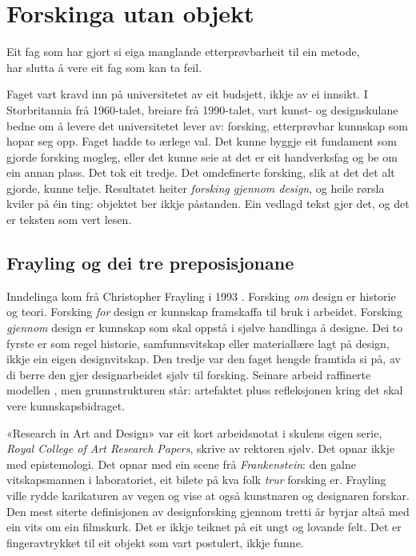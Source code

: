 \chapter{Forskinga utan objekt}

\begin{motto}
Eit fag som har gjort si eiga manglande etterprøvbarheit til ein metode,\\ har slutta å vere eit fag som kan ta feil.
\end{motto}

Faget vart kravd inn på universitetet av eit budsjett, ikkje av ei innsikt. I Storbritannia frå 1960-talet, breiare frå 1990-talet, vart kunst- og designskulane bedne om å levere det universitetet lever av: forsking, etterprøvbar kunnskap som hopar seg opp. Faget hadde to ærlege val. Det kunne byggje eit fundament som gjorde forsking mogleg, eller det kunne seie at det er eit handverksfag og be om ein annan plass. Det tok eit tredje. Det omdefinerte forsking, slik at det det alt gjorde, kunne telje. Resultatet heiter \emph{forsking gjennom design}, og heile rørsla kviler på éin ting: objektet ber ikkje påstanden. Ein vedlagd tekst gjer det, og det er teksten som vert lesen.


\section{Frayling og dei tre preposisjonane}

Inndelinga kom frå Christopher Frayling i 1993 \autocite{frayling1993}. Forsking \emph{om} design er historie og teori. Forsking \emph{for} design er kunnskap framskaffa til bruk i arbeidet. Forsking \emph{gjennom} design er kunnskap som skal oppstå i sjølve handlinga å designe. Dei to fyrste er som regel historie, samfunnsvitskap eller materiallære lagt på design, ikkje ein eigen designvitskap. Den tredje var den faget hengde framtida si på, av di berre den gjer designarbeidet sjølv til forsking. Seinare arbeid raffinerte modellen \autocite{frayling1993b}, men grunnstrukturen står: artefaktet pluss refleksjonen kring det skal vere kunnskapsbidraget.

«Research in Art and Design» var eit kort arbeidsnotat i skulens eigen serie, \textit{Royal College of Art Research Papers}, skrive av rektoren sjølv. Det opnar ikkje med epistemologi. Det opnar med ein scene frå \textit{Frankenstein}: den galne vitskapsmannen i laboratoriet, eit bilete på kva folk \emph{trur} forsking er. Frayling ville rydde karikaturen av vegen og vise at også kunstnaren og designaren forskar. Den mest siterte definisjonen av designforsking gjennom tretti år byrjar altså med ein vits om ein filmskurk. Det er ikkje teiknet på eit ungt og lovande felt. Det er fingeravtrykket til eit objekt som vart postulert, ikkje funne.


